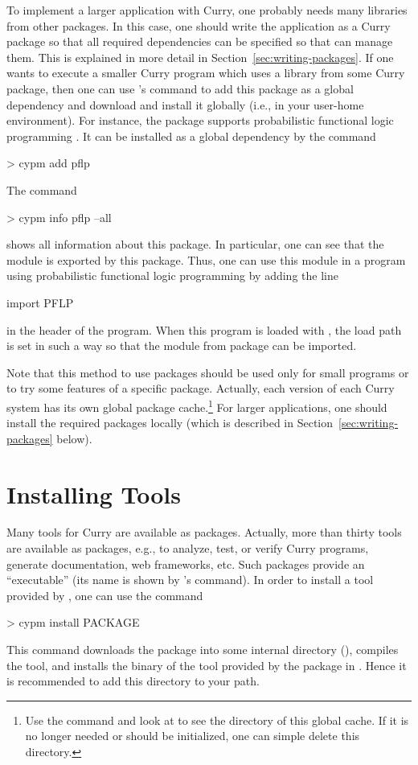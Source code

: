 To implement a larger application with Curry,
one probably needs many libraries
from other packages.
In this case, one should write the application as a Curry package
so that all required dependencies can be specified
so that \cpm can manage them.
This is explained in more detail in Section~\ref{sec:writing-packages}.
If one wants to execute a smaller Curry program
which uses a library from some Curry package,
then one can use \cpm's  command
to add this package as a global dependency and
download and install it globally (i.e., in your user-home environment).
For instance, the package  supports
probabilistic functional logic programming
\cite{ChristiansenDylusTeegen18}.
It can be installed as a global dependency by the command
%
\begin{curry}
> cypm add pflp
\end{curry}
%
The command
%
\begin{curry}
> cypm info pflp --all
\end{curry}
%
shows all information about this package.
In particular, one can see that the module 
is exported by this package.
Thus, one can use this module in a program
using probabilistic functional logic programming by adding the line
%
\begin{curry}
import PFLP
\end{curry}
%
in the header of the program.
When this program is loaded with \pakcs,
the load path is set in such a way so that
the module  from package 
can be imported.

Note that this method to use packages should be used only
for small programs or to try some features of a specific package.
Actually, each version of each Curry system
has its own global package cache.\footnote{%
Use the command  and look at 
to see the directory of this global cache.
If it is no longer needed or should be initialized,
one can simple delete this directory.}
For larger applications, one should install the required packages
locally (which is described in Section~\ref{sec:writing-packages} below).


\section{Installing Tools}
\label{sec:installing-tools}

Many tools for Curry are available as packages.
Actually, more than thirty tools are available as packages,
e.g., to analyze, test, or verify Curry programs,
generate documentation, web frameworks, etc.
Such packages provide an ``executable'' (its name is shown
by \cpm's  command).
In order to install a tool provided by ,
one can use the command
%
\begin{curry}
> cypm install PACKAGE
\end{curry}
%
This command downloads the package into some internal directory
(), compiles the tool,
and installs the binary of the tool provided by the package
in .
Hence it is recommended to add this directory to your path.


